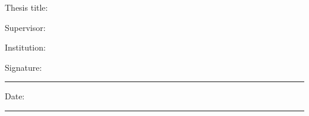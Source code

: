 ﻿
\vspace{2.0cm}
\noindent Thesis title: \emph{\PUThesisTitle}


\vspace{1.5cm}
\noindent Supervisor: \PUSupervisor


\vspace{0.4cm}
\noindent Institution: \PUSupervisorOrganization


\vspace{1.2cm}
\noindent Signature:\ \rule{6cm}{0.4pt}


\vspace{0.7cm}
\noindent Date:\ \rule{5cm}{0.4pt}